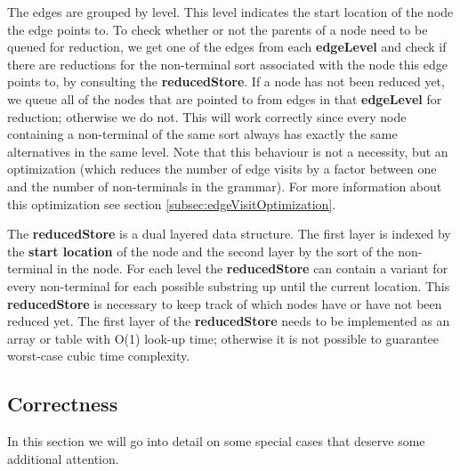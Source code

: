 \documentclass[a4paper,10pt]{article}
\begin{document}
The edges are grouped by level. This level indicates the start location of the node the edge points to. To check whether or not the parents of a node need to be queued for reduction, we get one of the edges from each {\bf edgeLevel} and check if there are reductions for the non-terminal sort associated with the node this edge points to, by consulting the {\bf reducedStore}. If a node has not been reduced yet, we queue all of the nodes that are pointed to from edges in that {\bf edgeLevel} for reduction; otherwise we do not. This will work correctly since every node containing a non-terminal of the same sort always has exactly the same alternatives in the same level. Note that this behaviour is not a necessity, but an optimization (which reduces the number of edge visits by a factor between one and the number of non-terminals in the grammar). For more information about this optimization see section \ref{subsec:edgeVisitOptimization}.

The {\bf reducedStore} is a dual layered data structure. The first layer is indexed by the {\bf start location} of the node and the second layer by the sort of the non-terminal in the node. For each level the {\bf reducedStore} can contain a variant for every non-terminal for each possible substring up until the current location. This {\bf reducedStore} is necessary to keep track of which nodes have or have not been reduced yet. The first layer of the {\bf reducedStore} needs to be implemented as an array or table with O(1) look-up time; otherwise it is not possible to guarantee worst-case cubic time complexity.

\subsection{Correctness}

In this section we will go into detail on some special cases that deserve some additional attention.
\end{document}
